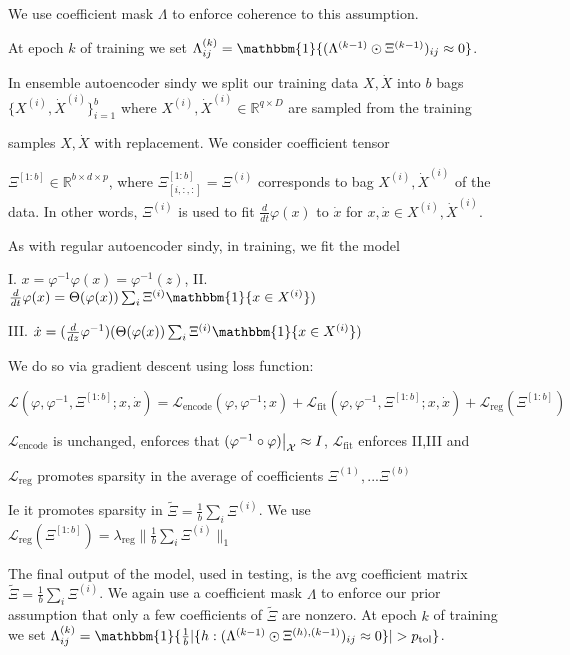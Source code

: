 \documentclass[11pt]{article}
\newcommand{\bs}{{\bigskip}}
\newcommand{\indi}{\mathbbm{1}}
\newcommand{\R}{\mathbb{R}}
\newcommand{\dd}[2]{\frac{d{#1}}{d{#2}}}
\newcommand{\norm}[2]{\| #1 \|_{#2}}
\newcommand{\restrict}[2]{#1\big{|}_{#2}}
\begin{document}
  We use coefficient mask $\Lambda$ to enforce coherence to this assumption.  
 
 At epoch $k$ of training we set $\Lambda ^{(k)}_{ij} = \indi\{(\Lambda ^{(k-1)}\odot \Xi^{(k-1)})_{ij} \approx 0\}$.
 
 \bs
 
 In ensemble autoencoder sindy we split our training data $X,\dot{X}$ 	into $b$ bags $\{X^{(i)},  \dot{X}^{(i)}\}_{i=1}^b$ where $X^{(i)},\dot{X}^{(i)} \in \R^{q \times D}$ are sampled from the training 
 
 samples $X,\dot{X}$ with replacement. 
  We consider coefficient tensor 
  
  $\Xi^{[1:b]} \in \R^{b \times d \times p}$,  where $\Xi^{[1:b]}_{[i,:,:]} = \Xi^{(i)}$ 
 corresponds to bag $X^{(i)},\dot{X}^{(i)}$ of the data.  In other words,  $\Xi^{(i)}$ is used to fit $\dd{}{t} \varphi(x)$ to $\dot{x}$ for $x,\dot{x} \in X^{(i)},\dot{X}^{(i)}$.
 
 As with regular autoencoder sindy,  in training, we fit the model 
 
  I.  $x =  \varphi^{-1} \varphi(x) = \varphi^{-1}(z)$, 
 II.  $\dd{}{t} \varphi(x) =  \Theta(\varphi(x))\sum_{i} \Xi^{(i)}\indi\{x \in X^{(i)}\})$
 
 III.  $\dot{x} = (\dd{}{z} \varphi^{-1})(\Theta(\varphi(x))\sum_{i} \Xi^{(i)}\indi\{x \in X^{(i)}\})$
 
 We do so via gradient descent using loss function:
 
 $\mathcal{L}(\varphi, \varphi^{-1}, \Xi^{[1:b]} ; x ,\dot{x}) = \mathcal{L}_\text{encode}(\varphi, \varphi^{-1}; x) + \mathcal{L}_\text{fit}(\varphi, \varphi^{-1},\Xi^{[1:b]}; x,\dot{x}) + \mathcal{L}_\text{reg}(\Xi^{[1:b]})$
 
  $\mathcal{L}_\text{encode}$ is unchanged, enforces that $\restrict{(\varphi^{-1} \circ \varphi)}{\mathcal{X}} \approx  I$,  
 $\mathcal{L}_\text{fit}$ enforces II,III and
  
  
   $\mathcal{L}_\text{reg}$ promotes sparsity in the average of coefficients  $\Xi^{(1)},...\Xi^{(b)}$
   
    Ie it promotes sparsity in   $\tilde{\Xi} = \frac{1}{b}\sum_{i} \Xi^{(i)}$.
     We use $\mathcal{L}_\text{reg}(\Xi^{[1:b]}) = \lambda_\text{reg}\norm{\frac{1}{b}\sum_{i} \Xi^{(i)}}{1}$
 
 
 The final output of the model, used in testing,  is the avg coefficient matrix  $\tilde{\Xi} = \frac{1}{b}\sum_{i} \Xi^{(i)}$.  We again use a coefficient mask $\Lambda$ to enforce our prior assumption that only a few coefficients of $\tilde{\Xi}$ are nonzero. 
 At epoch $k$ of training we set $\Lambda ^{(k)}_{ij} = \indi\{\frac{1}{b}
  | \{h : (\Lambda ^{(k-1)}\odot \Xi^{(h),(k-1)})_{ij} \approx 0\}| > p_\text{tol} \}$.
  
\end{document}
